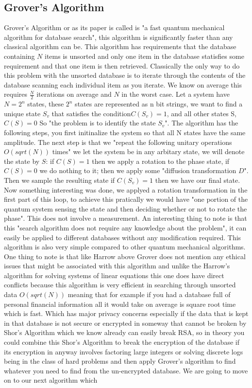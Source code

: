 \documentclass{article}
\begin{document}
\subsection{Grover's Algorithm} 
Grover's Algorithm or as its paper is called is "a fast quantum mechanical algorithm for database search",\cite{Grover1996} this algorithm is significantly faster than any classical algorithm can be. This algorithm has requirements that the database containing $N$ items is unsorted and only one item in the database statisfies some requirement and that one item is then retrieved. Classically the only way to do this problem with the unsorted database is to iterate through the contents of the database scanning each individual item as you iterate. We know on average this requires $\frac{N}{2}$ iterations on average and $N$ in the worst case. Let a system have $N = 2^n$ states, these $2^n$ states are represented as n bit strings, we want to find a unique state $S_v$ that satisfies the condition$C(S_v) = 1 $, and all other states S, $C(S) = 0$ So "the problem is to identify the state $S_v$".\cite{Grover1996} The algorithm has the following steps, you first initinalize the system so that all N states have the same amplitude. The next step is that we "repeat the following unitary operations $O(sqrt(N))$ times"\cite{Grover1996} we let the system be in any arbitary state, we will denote the state by $S$: if $C(S) = 1$ then we apply a rotation to the phase state, if $C(S) = 0$ we do nothing to it; then we apply some "diffusion transformation $D$"\cite{Grover1996}. Then we sample the resulting state if $C(S_{v}) = 1$ then we have our final state. Now something interesting was done, we applyed a rotation transformation in the first part of this loop, to achieve this pratically we would have "one portion of the quantum system sensing the state and then deciding whether or not to rotate the phase"\cite{Grover1996}. This does not involve a measurement. An interesting thing to note is that this "search algorithm does not require any knowledge about the problem"\cite{Grover1996}, it can easily be applied to different databases without any modification required. This algorithm is also very simple compared to other quantum mechanical algorithms. One thing to note is that like Harrow above Grover does not mention any ethical issues that might be associated with this algorithm and unlike the Harrow's algorithm for solving systems of linear equations this one does have direct conflicts because this algorithm is very efficient in searching through unsorted data $O(sqrt(N))$ meaning that for example if you had a database full of personal financial information all it would take on average is square root time which is fast. Which has major privacy concerns especially if the data that is kept in that database is not secure or encrypted in someway that cannot be broken by Shor's Algorithm which we know already can easily break RSA, so in theory you could combine this Shor's Algorithm to break the encryption of the database if its encryption in anyway involves factoring large integers or solving discrete logs being in the class of hard problems and then apply Grover's algorithm to find whatever you need to find from the un-encrypted database. We are going to move on to our next algorithm which 
\end{document}
